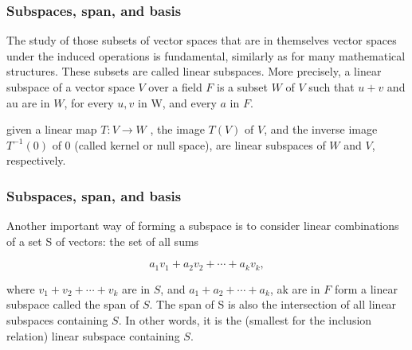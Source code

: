 \documentclass{beamer}
\begin{document}
    \begin{frame}
        \frametitle{Subspaces, span, and basis}
        The study of those subsets of vector spaces that are in themselves vector spaces under the induced operations is
        fundamental, similarly as for many mathematical structures. These subsets are called linear subspaces. More
        precisely, a linear subspace of a vector space $V$ over a field $F$ is a subset $W$ of $V$ such that $u+v$ and au are
        in $W$, for every $u, v$ in W, and every $a$ in $F$.
        \pause

        \begin{examples}
            given a linear map $T:V\to W$ , the image $T(V)$ of $V$, and the inverse image $ T^{-1}(0)$
            of 0 (called kernel or null space), are linear subspaces of $W$ and $V$, respectively.

        \end{examples}


    \end{frame}

    \begin{frame}
        \frametitle{Subspaces, span, and basis}
        Another important way of forming a subspace is to consider linear combinations of a set S of vectors: the set of
        all sums
        \pause
        \begin{alertblock}{}
            $$ a_{1}v_{1}+a_{2}v_{2}+\cdots +a_{k}v_{k}, $$

        \end{alertblock}
        \pause

        \begin{block}{}
            where $v_{1}+v_{2}+\cdots +v_{k}$ are in $S$, and $a_{1}+a_{2}+\cdots +a_{k}$, ak are in $F$ form a linear subspace
            called the span of $S$. The span of S is also the
            intersection of all linear subspaces containing $S$. In other words, it is the (smallest for the inclusion relation)
            linear subspace containing $S$.

        \end{block}


    \end{frame}
\end{document}
